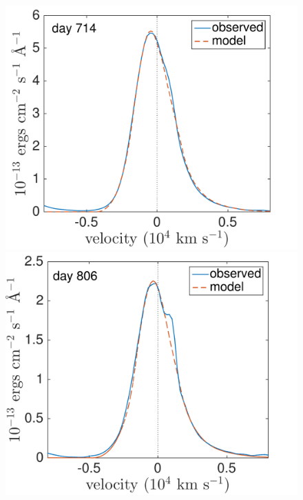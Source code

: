 \begin{figure}
\centering
\includegraphics[trim =0 38 0 0,clip=true,scale=0.37]{chapters/chapter5/images/smooth/best_fit/d714Ha_new.pdf}
\includegraphics[trim =0 38 0 0,clip=true,scale=0.37]{chapters/chapter5/images/smooth/best_fit/d806Ha_new.pdf}


\end{figure}
